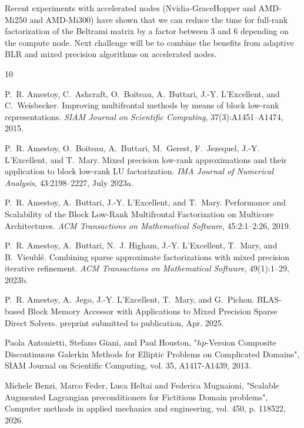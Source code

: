\documentclass[a4paper,12pt]{article}
\begin{document}
Recent experiments with accelerated nodes (Nvidia-GraceHopper and AMD-Mi250 and AMD-Mi300) have shown that we can reduce the time for full-rank factorization of the Beltrami matrix by a factor between 3 and 6 depending on the compute node. Next challenge will be to combine the benefits from adaptive BLR and mixed precision algorithms on accelerated nodes.







\begin{thebibliography}{10}

     P.~R. Amestoy, C.~Ashcraft, O.~Boiteau, A.~Buttari, J.-Y. L'Excellent, and C.~Weisbecker. Improving multifrontal methods by means of block low-rank representations. {\em SIAM Journal on Scientific Computing}, 37(3):A1451--A1474, 2015.

    P.~R. Amestoy, O.~Boiteau, A.~Buttari, M.~Gerest, F.~Jezequel, J.-Y. L'Excellent, and T.~Mary. Mixed precision low-rank approximations and their application to block low-rank {LU} factorization. {\em IMA Journal of Numerical Analysis}, 43:2198--2227, July 2023a.

     P.~R. Amestoy, A.~Buttari, J.-Y. L'Excellent, and T.~Mary. {Performance and Scalability of the Block Low-Rank Multifrontal Factorization on Multicore Architectures}. {\em ACM Transactions on Mathematical Software}, 45:2:1--2:26, 2019.

     P.~R. Amestoy, A.~Buttari, N.~J. Higham, J.-Y. L'Excellent, T.~Mary, and B.~Vieubl\'e. Combining sparse approximate factorizations with mixed precision iterative refinement. {\em ACM Transactions on Mathematical Software}, 49(1):1--29, 2023b.

     P.~R. Amestoy, A.~Jego, J.-Y. L'Excellent, T.~Mary, and G.~Pichon. {BLAS-based Block Memory Accessor with Applications to Mixed Precision Sparse Direct Solvers}. preprint submitted to publication, Apr. 2025.
      
    Paola Antonietti, Stefano Giani, and Paul Houston, "$hp$-Version Composite Discontinuous Galerkin Methods for Elliptic Problems on Complicated Domains", SIAM Journal on Scientific Computing, vol. 35, A1417-A1439, 2013.
      
    Michele Benzi, Marco Feder, Luca Heltai and Federica Mugnaioni, "Scalable Augmented Lagrangian preconditioners for Fictitious Domain problems", Computer methods in applied mechanics and engineering, vol. 450, p. 118522, 2026.
      

\end{thebibliography}
\end{document}
